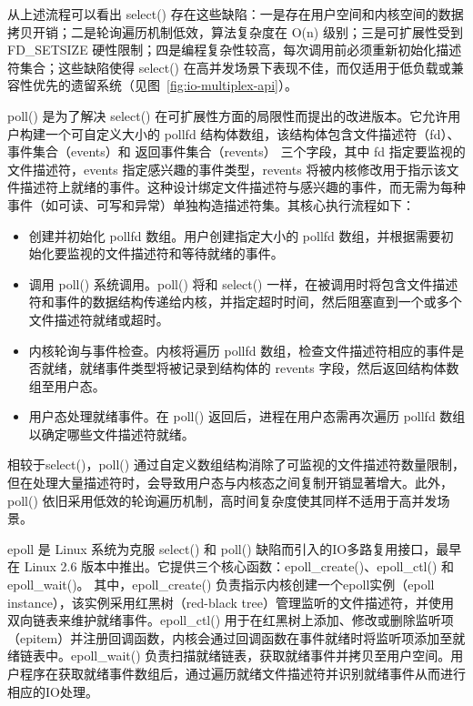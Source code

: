 {\begin{enumerate}[label=\arabic*.]
              从上述流程可以看出 select() 存在这些缺陷：一是存在用户空间和内核空间的数据拷贝开销；二是轮询遍历机制低效，算法复杂度在 O(n) 级别；三是可扩展性受到 FD\_SETSIZE 硬性限制；四是编程复杂性较高，每次调用前必须重新初始化描述符集合；这些缺陷使得 select() 在高并发场景下表现不佳，而仅适用于低负载或兼容性优先的遗留系统（见图~\ref{fig:io-multiplex-api}）。

              poll() 是为了解决 select() 在可扩展性方面的局限性而提出的改进版本。它允许用户构建一个可自定义大小的 pollfd 结构体数组，该结构体包含文件描述符（fd）、事件集合（events）和 返回事件集合（revents） 三个字段，其中 fd 指定要监视的文件描述符，events 指定感兴趣的事件类型，revents 将被内核修改用于指示该文件描述符上就绪的事件。这种设计绑定文件描述符与感兴趣的事件，而无需为每种事件（如可读、可写和异常）单独构造描述符集。其核心执行流程如下：
              \begin{itemize}
                  \item 创建并初始化 pollfd 数组。用户创建指定大小的 pollfd 数组，并根据需要初始化要监视的文件描述符和等待就绪的事件。
                  \item 调用 poll() 系统调用。poll() 将和 select() 一样，在被调用时将包含文件描述符和事件的数据结构传递给内核，并指定超时时间，然后阻塞直到一个或多个文件描述符就绪或超时。
                  \item 内核轮询与事件检查。内核将遍历 pollfd 数组，检查文件描述符相应的事件是否就绪，就绪事件类型将被记录到结构体的 revents 字段，然后返回结构体数组至用户态。
                  \item 用户态处理就绪事件。在 poll() 返回后，进程在用户态需再次遍历 pollfd 数组以确定哪些文件描述符就绪。
              \end{itemize}

              相较于select()，poll() 通过自定义数组结构消除了可监视的文件描述符数量限制，但在处理大量描述符时，会导致用户态与内核态之间复制开销显著增大。此外，poll() 依旧采用低效的轮询遍历机制，高时间复杂度使其同样不适用于高并发场景。

              epoll 是 Linux 系统为克服 select() 和 poll() 缺陷而引入的IO多路复用接口，最早在 Linux 2.6 版本中推出。它提供三个核心函数：epoll\_create()、epoll\_ctl() 和 epoll\_wait()。 其中，epoll\_create() 负责指示内核创建一个epoll实例（epoll instance），该实例采用红黑树（red-black tree）管理监听的文件描述符，并使用双向链表来维护就绪事件。epoll\_ctl() 用于在红黑树上添加、修改或删除监听项（epitem）并注册回调函数，内核会通过回调函数在事件就绪时将监听项添加至就绪链表中。epoll\_wait() 负责扫描就绪链表，获取就绪事件并拷贝至用户空间。用户程序在获取就绪事件数组后，通过遍历就绪文件描述符并识别就绪事件从而进行相应的IO处理。


\end{enumerate}}
